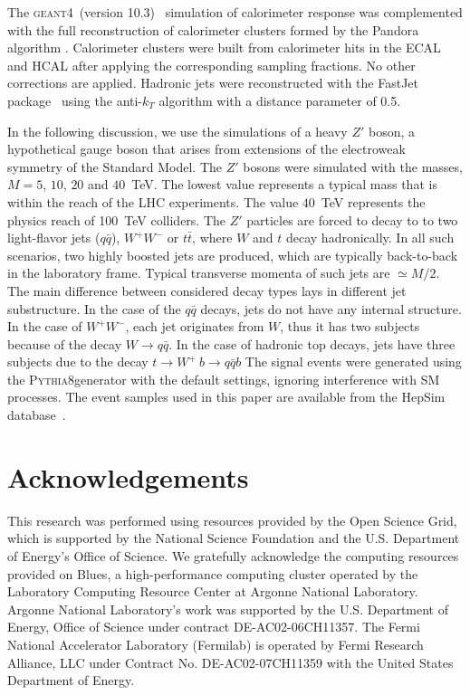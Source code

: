 \documentclass[final,1p,11pt]{elsarticle}
\newcommand{\GEANTfour} {\textsc{geant4}}
\newcommand{\pythia} {\textsc{Pythia8}}
\begin{document}
The \GEANTfour\ (version 10.3)~\cite{Allison2016186} simulation of calorimeter response was complemented 
with the full reconstruction of calorimeter clusters formed by the Pandora algorithm \cite{Charles:2009ta,Marshall:2013bda}.
Calorimeter clusters were built from calorimeter hits in the  ECAL and HCAL after applying the corresponding sampling fractions.
No other corrections are applied.
Hadronic jets were 
reconstructed with the {\sc FastJet} package~\cite{fastjet} using the anti-$k_T$ algorithm \cite{Cacciari:2008gp}
with  a distance parameter of 0.5. 

In the following discussion, we use the simulations of a heavy $Z'$ boson, 
a hypothetical gauge boson  that arises from extensions of the electroweak symmetry of the Standard Model.
The $Z'$ bosons were simulated with the masses, $M=5$, $10$, $20$ and $40$~TeV. The lowest value 
represents a typical mass that is within the reach of the LHC experiments. The  value $40$~TeV 
represents the physics reach of 100~TeV colliders. The $Z'$ particles are forced to decay to 
to two light-flavor jets ($q\bar{q}$), $W^+W^-$ or $t\bar{t}$, where
$W$ and $t$ decay hadronically. In all such scenarios, two highly boosted
jets are produced,  which are typically back-to-back in the laboratory frame.
Typical transverse momenta of such jets are $\simeq M/2$.
The main difference between considered decay types lays in different jet substructure. In the case of the $q\bar{q}$ decays,
jets do not have any internal structure. In the case of  $W^+W^-$, each jet  originates from $W$, thus it has two
subjects because of the decay $W\rightarrow q\bar{q}$. In the case of hadronic top decays, jets have three subjects due
to the decay $t \rightarrow  W^+\>b \rightarrow q\bar{q} b$    
The signal events were generated using the \pythia generator with the default settings,
ignoring interference with SM processes.
The event samples used in this paper are  available from the
HepSim  database~\cite{Chekanov:2014fga}.














\section*{Acknowledgements}
This research was performed using resources provided by the Open Science Grid,
which is supported by the National Science Foundation and the U.S. Department of Energy's Office of Science. 
We gratefully acknowledge the computing resources provided on Blues, 
a high-performance computing cluster operated by the Laboratory Computing Resource Center at Argonne National Laboratory.
Argonne National Laboratory's work was supported by the U.S. Department of Energy, Office of Science under contract DE-AC02-06CH11357.
The Fermi National Accelerator Laboratory (Fermilab) is operated by Fermi Research Alliance, LLC under Contract No. DE-AC02-07CH11359 with the United States Department of Energy.
\end{document}
